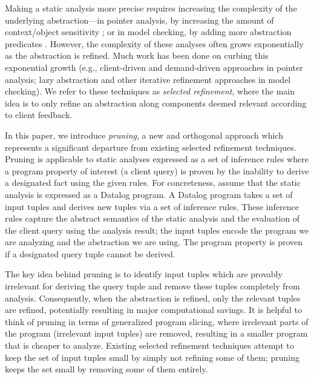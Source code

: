 
Making a static analysis more precise requires increasing the complexity of the
underlying abstraction---in pointer analysis, by increasing the amount of
context/object sensitivity \cite{kcfa, kobj, MilanovaRountevRyder2005,
WhaleyLam2004, LhotakHendren2006, LhotakHendren2008}; or in model checking, by
adding more abstraction predicates \cite{graf97predicate,slam}.
However, the complexity of these analyses often grows exponentially as the
abstraction is refined.
Much work has been done on curbing this exponential growth
(e.g., client-driven \cite{GuyerLin2003} and demand-driven
\cite{HeintzeTardieu2001} approaches in pointer analysis;
lazy abstraction \cite{henzinger02lazy,mcmillan06lazy} and other iterative refinement approaches in model checking).
We refer to these techniques as {\em selected refinement},
where the main idea is to only refine an abstraction along components
deemed relevant according to client feedback.

In this paper, we introduce {\em pruning}, a new and orthogonal approach which represents a
significant departure from existing selected refinement techniques.  Pruning is
applicable to static analyses expressed as a set of inference rules where a
program property of interest (a client query) is proven by the inability to
derive a designated fact using the given rules.  For concreteness, assume that
the static analysis is expressed as a Datalog program.  A Datalog program takes
a set of input tuples and derives new tuples via a set of inference rules.
These inference rules capture the abstract semantics of the static analysis and
the evaluation of the client query using the analysis result; the input tuples encode the program we are
analyzing and the abstraction we are using.  The program property is proven if a
designated query tuple cannot be derived.

The key idea behind pruning is to identify input tuples which are provably
irrelevant for deriving the query tuple and remove these tuples completely from
analysis.  Consequently, when the abstraction is refined, only the relevant
tuples are refined, potentially resulting in major computational savings.  It
is helpful to think of pruning in terms of generalized program slicing, where
irrelevant parts of the program (irrelevant input tuples) are removed,
resulting in a smaller program that is cheaper to analyze.  Existing selected
refinement techniques attempt to keep the set of input tuples small by simply
not refining some of them; pruning keeps the set small by removing some of them
entirely.

